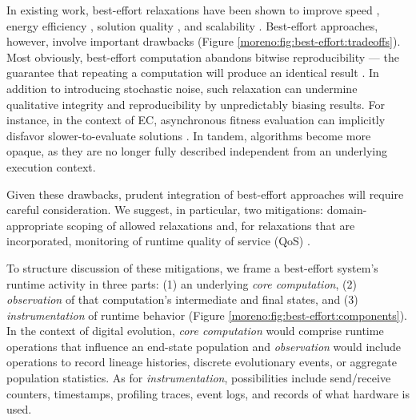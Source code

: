 In existing work, best-effort relaxations have been shown to improve speed \cite{kasap2018dynamic,chakrapani2008probabilistic}, energy efficiency \cite{chakrapani2008probabilistic,bocquet2018memory}, solution quality \cite{rinard2013parallel}, and scalability \cite{meng2009best}.  %
Best-effort approaches, however, involve important drawbacks (Figure \ref{moreno:fig:best-effort:tradeoffs}).
Most obviously, best-effort computation abandons bitwise reproducibility --- the guarantee that repeating a computation will produce an identical result \cite{menon2025reproducibility}.
In addition to introducing stochastic noise, such relaxation can undermine qualitative integrity and reproducibility by unpredictably biasing results.
For instance, in the context of EC, asynchronous fitness evaluation can implicitly disfavor slower-to-evaluate solutions \cite{scott2015understanding,scott2016evaluation,scott2022avoiding,guijt2023impact,karns2025evaluation}.
In tandem, algorithms become more opaque, as they are no longer fully described independent from an underlying execution context.

Given these drawbacks, prudent integration of best-effort approaches will require careful consideration.
We suggest, in particular, two mitigations: domain-appropriate scoping of allowed relaxations and, for relaxations that are incorporated, monitoring of runtime quality of service (QoS) \cite{karakus2017quality}.

To structure discussion of these mitigations, we frame a best-effort system's runtime activity in three parts: (1) an underlying \textit{core computation}, (2) \textit{observation} of that computation's intermediate and final states, and (3) \textit{instrumentation} of runtime behavior (Figure \ref{moreno:fig:best-effort:components}).
In the context of digital evolution, \textit{core computation} would comprise runtime operations that influence an end-state population and \textit{observation} would include operations to record lineage histories, discrete evolutionary events, or aggregate population statistics.
As for \textit{instrumentation}, possibilities include send/receive counters, timestamps, profiling traces, event logs, and records of what hardware is used.

